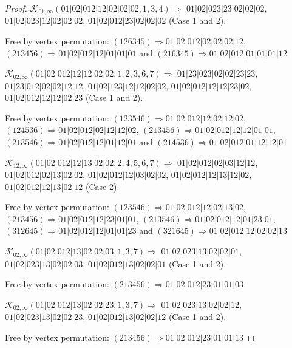 \documentclass[12pt]{article}
\theoremstyle{plain}
\theoremstyle{definition}
\theoremstyle{remark}
\newcommand{\fancy}[1]{\mathcal{#1}}
\def\K{\fancy{K}}
\begin{document}
\begin{proof}
	
	\bigskip
	
	$\K_{01,\infty}(01|02|012|12|02|02|02,1, 3, 4)\Rightarrow $ $01|02|023|23|02|02|02$, $01|02|023|12|02|02|02$, $01|02|012|23|02|02|02$ (Case 1 and 2).
	
	
	
	Free by vertex permutation: $(1 2 6 3 4 5)\Rightarrow 01|02|012|02|02|02|12$, $(2 1 3 4 5 6)\Rightarrow 01|02|012|12|01|01|01$ and $(2 1 6 3 4 5)\Rightarrow 01|02|012|01|01|01|12$
	
	
	\bigskip
	
	$\K_{02,\infty}(01|02|012|12|12|02|02,1, 2, 3, 6, 7)\Rightarrow $ $01|23|023|02|02|23|23$, $01|23|012|02|02|12|12$, $01|02|123|12|12|02|02$, $01|02|012|12|12|23|02$, $01|02|012|12|12|02|23$ (Case 1 and 2).
	
	
	
	Free by vertex permutation: $(1 2 3 5 4 6)\Rightarrow 01|02|012|12|02|12|02$, $(1 2 4 5 3 6)\Rightarrow 01|02|012|02|12|12|02$, $(2 1 3 4 5 6)\Rightarrow 01|02|012|12|12|01|01$, $(2 1 3 5 4 6)\Rightarrow 01|02|012|12|01|12|01$ and $(2 1 4 5 3 6)\Rightarrow 01|02|012|01|12|12|01$
	
	
	\bigskip
	
	$\K_{12,\infty}(01|02|012|12|13|02|02,2, 4, 5, 6, 7)\Rightarrow $ $01|02|012|02|03|12|12$, $01|02|012|02|13|02|02$, $01|02|012|12|03|02|02$, $01|02|012|12|13|12|02$, $01|02|012|12|13|02|12$ (Case 2).
	
	
	
	Free by vertex permutation: $(1 2 3 5 4 6)\Rightarrow 01|02|012|12|02|13|02$, $(2 1 3 4 5 6)\Rightarrow 01|02|012|12|23|01|01$, $(2 1 3 5 4 6)\Rightarrow 01|02|012|12|01|23|01$, $(3 1 2 6 4 5)\Rightarrow 01|02|012|12|01|01|23$ and $(3 2 1 6 4 5)\Rightarrow 01|02|012|12|02|02|13$
	
	
	\bigskip
	
	$\K_{02,\infty}(01|02|012|13|02|02|03,1, 3, 7)\Rightarrow $ $01|02|023|13|02|02|01$, $01|02|023|13|02|02|03$, $01|02|012|13|02|02|01$ (Case 1 and 2).
	
	
	
	Free by vertex permutation: $(2 1 3 4 5 6)\Rightarrow 01|02|012|23|01|01|03$
	
	
	\bigskip
	
	$\K_{02,\infty}(01|02|012|13|02|02|23,1, 3, 7)\Rightarrow $ $01|02|023|13|02|02|12$, $01|02|023|13|02|02|23$, $01|02|012|13|02|02|12$ (Case 1 and 2).
	
	
	
	Free by vertex permutation: $(2 1 3 4 5 6)\Rightarrow 01|02|012|23|01|01|13$
	

\end{proof}
\end{document}
